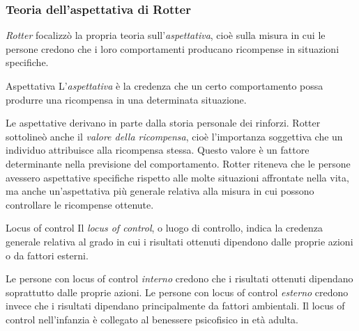 \documentclass[a4paper]{article}
\begin{document}
\subsubsection{Teoria dell'aspettativa di Rotter}
\emph{Rotter} focalizzò la propria teoria sull'\emph{aspettativa}, cioè sulla misura in cui le persone credono che i loro comportamenti producano ricompense in situazioni specifiche.
\begin{snippetdefinition}{Aspettativa}
    L'\emph{aspettativa} è la credenza che un certo comportamento possa produrre una ricompensa in una determinata situazione.
\end{snippetdefinition}
Le aspettative derivano in parte dalla storia personale dei rinforzi.
Rotter sottolineò anche il \emph{valore della ricompensa}, cioè l'importanza soggettiva che un individuo attribuisce alla ricompensa stessa. Questo valore è un fattore determinante nella previsione del comportamento.
Rotter riteneva che le persone avessero aspettative specifiche rispetto alle molte situazioni affrontate nella vita, ma anche un'aspettativa più generale relativa alla misura in cui possono controllare le ricompense ottenute.
\begin{snippetdefinition}{Locus of control}
    Il \emph{locus of control}, o luogo di controllo, indica la credenza generale relativa al grado in cui i risultati ottenuti dipendono dalle proprie azioni o da fattori esterni.
\end{snippetdefinition}
Le persone con locus of control \emph{interno} credono che i risultati ottenuti dipendano soprattutto dalle proprie azioni. Le persone con locus of control \emph{esterno} credono invece che i risultati dipendano principalmente da fattori ambientali.
Il locus of control nell'infanzia è collegato al benessere psicofisico in età adulta.
\end{document}
